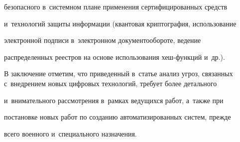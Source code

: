 безопас\-но\-го в~системном плане применения сертифицированных средств 


и~технологий защиты информации (квантовая криптография, использование 


электронной подписи в~электронном документообороте, ведение 


распределенных реестров на основе использования хеш-функ\-ций и~др.). 


   


   В заключение отметим, что приведенный в~статье анализ угроз, связанных с~внедрением новых цифровых технологий, требует более детального 


и~внимательного рассмотрения в~рамках ведущихся работ, а~также при 


постановке новых работ по созданию автоматизированных сис\-тем, прежде 


всего военного и~специального назначения. 





\vspace*{-6pt}


   


